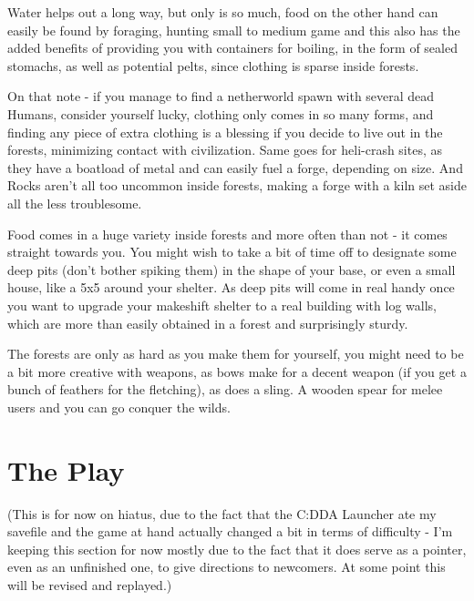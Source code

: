 \documentclass[11pt]{report}
\begin{document}
Water helps out a long way, but only is so much, food on the other hand can easily be found by foraging, hunting small to medium game and this also has the added benefits of providing you with containers for boiling, in the form of sealed stomachs, as well as potential pelts, since clothing is sparse inside forests.

On that note - if you manage to find a netherworld spawn with several dead Humans, consider yourself lucky, clothing only comes in so many forms, and finding any piece of extra clothing is a blessing if you decide to live out in the forests, minimizing contact with civilization.
Same goes for heli-crash sites, as they have a boatload of metal and can easily fuel a forge, depending on size. And Rocks aren't all too uncommon inside forests, making a forge with a kiln set aside all the less troublesome.

Food comes in a huge variety inside forests and more often than not - it comes straight towards you. You might wish to take a bit of time off to designate some deep pits (don't bother spiking them) in the shape of your base, or even a small house, like a 5x5 around your shelter. As deep pits will come in real handy once you want to upgrade your makeshift shelter to a real building with log walls, which are more than easily obtained in a forest and surprisingly sturdy.

The forests are only as hard as you make them for yourself, you might need to be a bit more creative with weapons, as bows make for a decent weapon (if you get a bunch of feathers for the fletching), as does a sling. A wooden spear for melee users and you can go conquer the wilds.

\chapter{The Play}

(This is for now on hiatus, due to the fact that the C:DDA Launcher ate my savefile and the game at hand actually changed a bit in terms of difficulty - I'm keeping this section for now mostly due to the fact that it does serve as a pointer, even as an unfinished one, to give directions to newcomers. At some point this will be revised and replayed.)
\end{document}
